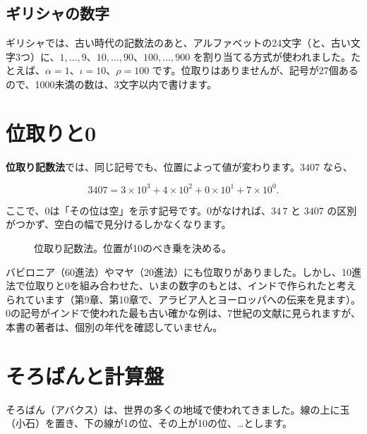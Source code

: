 \documentclass[a4paper,11pt,openany]{ltjsbook}
\begin{document}
\subsection{ギリシャの数字}

ギリシャでは、古い時代の記数法のあと、アルファベットの24文字（と、古い文字3つ）に、$1,\ldots,9$、$10,\ldots,90$、$100,\ldots,900$ を割り当てる方式が使われました。たとえば、$\alpha=1$、$\iota=10$、$\rho=100$ です。位取りはありませんが、記号が27個あるので、1000未満の数は、3文字以内で書けます。

\section{位取りと0}

\textbf{位取り記数法}では、同じ記号でも、位置によって値が変わります。$3407$ なら、

\[
3407=3\times10^3+4\times10^2+0\times10^1+7\times10^0.
\]

ここで、0は「その位は空」を示す記号です。0がなければ、$34\,7$ と $3407$ の区別がつかず、空白の幅で見分けるしかなくなります。

\begin{figure}[htbp]
\centering
{}
\caption{位取り記数法。位置が10のべき乗を決める。}
\end{figure}

バビロニア（60進法）やマヤ（20進法）にも位取りがありました。しかし、10進法で位取りと0を組み合わせた、いまの数字のもとは、インドで作られたと考えられています（第9章、第10章で、アラビア人とヨーロッパへの伝来を見ます）。0の記号がインドで使われた最も古い確かな例は、7世紀の文献に見られますが、本書の著者は、個別の年代を確認していません。

\section{そろばんと計算盤}

そろばん（アバクス）は、世界の多くの地域で使われてきました。線の上に玉（小石）を置き、下の線が1の位、その上が10の位、…とします。
\end{document}
